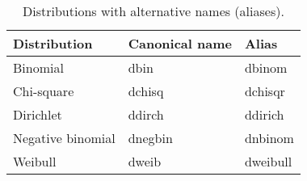 
\begin{table}[!h]
  \begin{center}
    \begin{tabular}{lll}
      \hline
      Distribution & Canonical name & Alias \\
      \hline
     Binomial & dbin & dbinom \\
     Chi-square & dchisq & dchisqr \\     
Dirichlet & ddirch & ddirich \\
Negative binomial & dnegbin & dnbinom  \\
    Weibull & dweib & dweibull \\ 
     \hline
    \end{tabular}
  \caption{Distributions with alternative names (aliases).}
    \label{table:distributions-aliases}
  \end{center}
\end{table}

\newpage